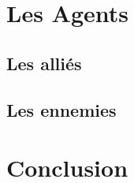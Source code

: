 \documentclass[11pt, letterpaper]{article}
\begin{document}
\section{Les Agents}

\subsection{Les alliés}

\subsection{Les ennemies}



\newpage

\section*{Conclusion}
\end{document}
